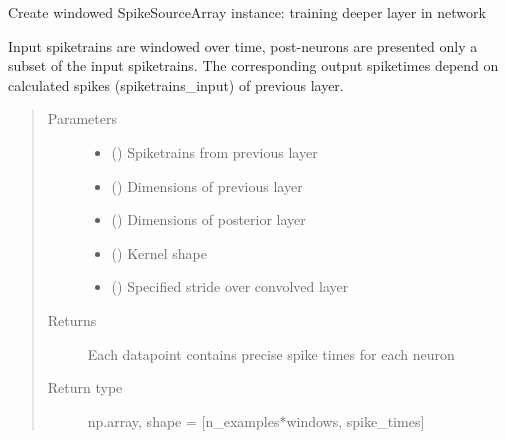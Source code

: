 \documentclass[letterpaper,10pt,english]{sphinxmanual}
\begin{document}
\begin{fulllineitems}
\label{\detokenize{SpikingConvNet:SpikingConvNet.algorithms.windowed_spikes}}
Create windowed SpikeSourceArray
instance: training deeper layer in network

Input spiketrains are windowed over time, post-neurons are presented only
a subset of the input spiketrains. The corresponding output spiketimes
depend on calculated spikes (spiketrains\_input) of previous layer.
\begin{quote}\begin{description}
\item[{Parameters}] \leavevmode\begin{itemize}
\item {} 
 () \textendash{} Spiketrains from previous layer

\item {} 
 () \textendash{} Dimensions of previous layer

\item {} 
 () \textendash{} Dimensions of posterior layer

\item {} 
 () \textendash{} Kernel shape

\item {} 
 () \textendash{} Specified stride over convolved layer

\end{itemize}

\item[{Returns}] \leavevmode
{} \textendash{} Each datapoint contains precise spike times for each neuron

\item[{Return type}] \leavevmode
np.array, shape = {[}n\_examples*windows, spike\_times{]}

\end{description}\end{quote}

\end{fulllineitems}
\end{document}
